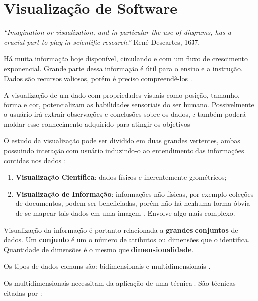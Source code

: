 \chapter{Visualização de Software}\label{chap:visualizacao}

\textit{``Imagination or visualization, and in particular the use of diagrams,
has a crucial part to play in scientific research.''} René Descartes, 1637.

Há muita informação hoje disponível, circulando e com um fluxo de crescimento
exponencial. Grande parte dessa informação é útil para o ensino e a instrução.
Dados são recursos valiosos, porém é preciso compreendê-los \cite{messias2012}.

A visualização de um dado com propriedades visuais como posição, tamanho, forma
e cor, potencializam as habilidades sensoriais do ser humano. Possivelmente o usuário
irá extrair observações e conclusões sobre os dados, e também poderá moldar esse
conhecimento adquirido para atingir os objetivos \cite{card1999readings}
\cite{heer2012interactive} \cite{keim2002information}.

O estudo da visualização pode ser dividido em duas grandes vertentes, ambas
possuindo interação com usuário induzindo-o ao entendimento das informações
contidas nos dados \cite{de2003visual}:

\begin{enumerate}
  \item \textbf{Visualização Científica}: dados físicos e inerentemente
  geométricos;
  \item \textbf{Visualização de Informação}: informações não físicas, por
  exemplo coleções de documentos, podem ser beneficiadas, porém não há nenhuma
  forma óbvia de se mapear tais dados em uma imagem \cite{card1999readings}.
  Envolve algo mais complexo.
\end{enumerate}

Visualização da informação é portanto relacionada a \textbf{grandes conjuntos}
de dados. Um \textbf{conjunto} é um o número de atributos ou dimensões que o
identifica. Quantidade de dimensões é o mesmo que \textbf{dimensionalidade}.

Os tipos de dados comuns são: bidimensionais e multidimensionais
\cite{de2003visual}.

Os multidimensionais necessitam da aplicação de uma técnica
\cite{keim2002information}. São técnicas citadas por :

